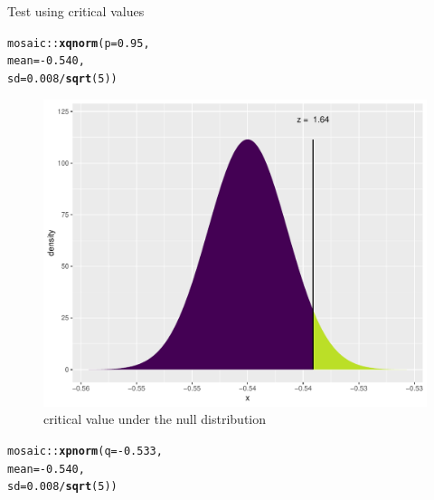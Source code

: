 \documentclass[10pt,handout]{beamer}\usepackage[]{graphicx}\usepackage[]{color}
\makeatletter
\def\maxwidth{ %
  \ifdim\Gin@nat@width>\linewidth
    \linewidth
  \else
    \Gin@nat@width
  \fi
}
\newcommand{\hlnum}[1]{\textcolor[rgb]{0.686,0.059,0.569}{#1}}%
\newcommand{\hlopt}[1]{\textcolor[rgb]{0,0,0}{#1}}%
\newcommand{\hlstd}[1]{\textcolor[rgb]{0.345,0.345,0.345}{#1}}%
\newcommand{\hlkwc}[1]{\textcolor[rgb]{0.333,0.667,0.333}{#1}}%
\newcommand{\hlkwd}[1]{\textcolor[rgb]{0.737,0.353,0.396}{\textbf{#1}}}%
\newenvironment{kframe}{%
 \def\at@end@of@kframe{}%
 \ifinner\ifhmode%
  \def\at@end@of@kframe{\end{minipage}}%
  \begin{minipage}{\columnwidth}%
 \fi\fi%
 \def\FrameCommand##1{\hskip\@totalleftmargin \hskip-\fboxsep
 \colorbox{shadecolor}{##1}\hskip-\fboxsep
     \hskip-\linewidth \hskip-\@totalleftmargin \hskip\columnwidth}%
 \MakeFramed {\advance\hsize-\width
   \@totalleftmargin\z@ \linewidth\hsize
   \@setminipage}}%
 {\par\unskip\endMakeFramed%
 \at@end@of@kframe}
\newenvironment{knitrout}{}{} %
\makeatother
\begin{document}
\begin{frame}[fragile]{Test using critical values}
	
	
	\begin{minipage}{0.47\textwidth}
\begin{knitrout}\tiny
{}\color{fgcolor}\begin{kframe}
\begin{alltt}
\hlstd{mosaic}\hlopt{::}\hlkwd{xqnorm}\hlstd{(}\hlkwc{p} \hlstd{=} \hlnum{0.95}\hlstd{,}
\hlkwc{mean} \hlstd{=} \hlopt{-}\hlnum{0.540}\hlstd{,}
\hlkwc{sd} \hlstd{=} \hlnum{0.008}\hlopt{/}\hlkwd{sqrt}\hlstd{(}\hlnum{5}\hlstd{))}
\end{alltt}
\end{kframe}\begin{figure}

{\centering \includegraphics[width=\maxwidth]{figure/unnamed-chunk-4-1} 

}

\caption[critical value under the null distribution]{critical value under the null distribution}\label{fig:unnamed-chunk-4}
\end{figure}


\end{knitrout}
	\end{minipage}
	\begin{minipage}{0.47\textwidth}
\begin{knitrout}\tiny
{}\color{fgcolor}\begin{kframe}
\begin{alltt}
\hlstd{mosaic}\hlopt{::}\hlkwd{xpnorm}\hlstd{(}\hlkwc{q} \hlstd{=} \hlopt{-}\hlnum{0.533}\hlstd{,}
\hlkwc{mean} \hlstd{=} \hlopt{-}\hlnum{0.540}\hlstd{,}
\hlkwc{sd} \hlstd{=} \hlnum{0.008}\hlopt{/}\hlkwd{sqrt}\hlstd{(}\hlnum{5}\hlstd{))}
\end{alltt}
\end{kframe}\begin{figure}


\end{figure}
\end{knitrout}
\end{minipage}
\end{frame}
\end{document}
